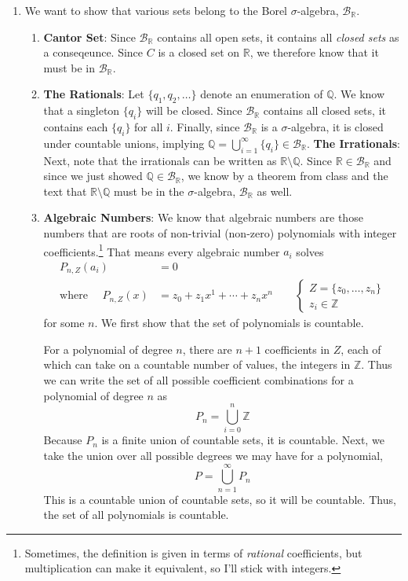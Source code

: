 \documentclass[12pt]{article}
\theoremstyle{plain}
\theoremstyle{definition}
\theoremstyle{remark}
\begin{document}
\begin{enumerate}
\item We want to show that various sets belong to the Borel $\sigma$-algebra, $\mathscr{B}_\mathbb{R}$.
\begin{enumerate} 
    \item \textbf{Cantor Set}: Since $\mathscr{B}_\mathbb{R}$ contains all open sets, it contains all \emph{closed sets} as a conseqeunce. Since $C$ is a closed set on $\mathbb{R}$, we therefore know that it must be in $\mathscr{B}_\mathbb{R}$.
    \item \textbf{The Rationals}: Let $\{q_1, q_2, \ldots\}$ denote an enumeration of $\mathbb{Q}$. We know that a singleton $\{q_i\}$ will be closed. Since $\mathscr{B}_\mathbb{R}$ contains all closed sets, it contains each $\{q_i\}$ for all $i$. Finally, since $\mathscr{B}_\mathbb{R}$ is a $\sigma$-algebra, it is closed under countable unions, implying $\mathbb{Q} = \bigcup^\infty_{i=1} \{q_i\} \in \mathscr{B}_\mathbb{R}$.  
\textbf{The Irrationals}: Next, note that the irrationals can be written as $\mathbb{R}\setminus \mathbb{Q}$. Since $\mathbb{R}\in\mathscr{B}_\mathbb{R}$ and since we just showed $\mathbb{Q}\in\mathscr{B}_\mathbb{R}$, we know by a theorem from class and the text that $\mathbb{R}\setminus \mathbb{Q}$ must be in the $\sigma$-algebra, $\mathscr{B}_\mathbb{R}$ as well.

\item \textbf{Algebraic Numbers}: We know that algebraic numbers are those numbers that are roots of non-trivial (non-zero) polynomials with integer coefficients.\footnote{Sometimes, the definition is given in terms of \emph{rational} coefficients, but multiplication can make it equivalent, so I'll stick with integers.} That means every algebraic number $a_i$ solves
\begin{align*}
    P_{n, Z}(a_i) &= 0 \\
    \text{where } \quad P_{n,Z}(x) &= z_0 + z_1 x^1 + \cdots 
    + z_n x^n
    \qquad 
    \begin{cases}
        Z = \{z_0, \ldots, z_n\} \\
        z_i\in\mathbb{Z}
    \end{cases}
\end{align*}
for some $n$. We first show that the set of polynomials is countable.

For a polynomial of degree $n$, there are $n+1$ coefficients in ${Z}$, each of which can take on a countable number of values, the integers in $\mathbb{Z}$. Thus we can write the set of all possible coefficient combinations for a polynomial of degree $n$ as 
\[
    P_n = \bigcup^{n}_{i=0} \mathbb{Z}
\]
Because $P_n$ is a finite union of countable sets, it is countable. Next, we take the union over all possible degrees we may have for a polynomial,
\begin{equation}
    \label{q9}
    P = \bigcup_{n=1}^\infty P_n
\end{equation}
This is a countable union of countable sets, so it will be countable. Thus, the set of all polynomials is countable.


\end{enumerate}
\end{enumerate}
\end{document}
